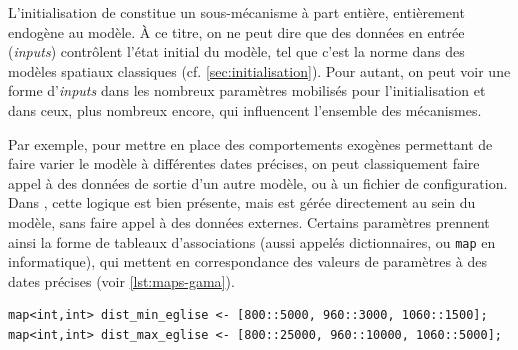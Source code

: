 L'initialisation de \simfeodal{} constitue un sous-mécanisme à part entière, entièrement endogène au modèle.
À ce titre, on ne peut dire que des données en entrée (\textit{inputs}) contrôlent l'état initial du modèle, tel que c'est la norme dans des modèles spatiaux classiques (cf. \cref{sec:initialisation}).
Pour autant, on peut voir une forme d'\textit{inputs} dans les nombreux paramètres mobilisés pour l'initialisation et dans ceux, plus nombreux encore, qui influencent l'ensemble des mécanismes.

Par exemple, pour mettre en place des comportements exogènes permettant de faire varier le modèle à différentes dates précises, on peut classiquement faire appel à des données de sortie d'un autre modèle, ou à un fichier de configuration.
Dans \simfeodal{}, cette logique est bien présente, mais est gérée directement au sein du modèle, sans faire appel à des données externes.
Certains paramètres prennent ainsi la forme de tableaux d'associations (aussi appelés dictionnaires, ou \og \texttt{map}\fg{} en informatique), qui mettent en correspondance des valeurs de paramètres à des dates précises (voir \cref{lst:maps-gama}).
\medskip

{\footnotesize
	\begin{lstlisting}[caption={
	Deux exemples de \texttt{map} dans Gama.
	\textit{À partir de 800, les églises doivent se situer entre 5 et 25~km, puis entre 3 et 10~km de 960 à 1060, et entre 1.5 et 5~km après cette date.}}, captionpos=b, label={lst:maps-gama}]
map<int,int> dist_min_eglise <- [800::5000, 960::3000, 1060::1500];
map<int,int> dist_max_eglise <- [800::25000, 960::10000, 1060::5000]; 
	\end{lstlisting}
}



